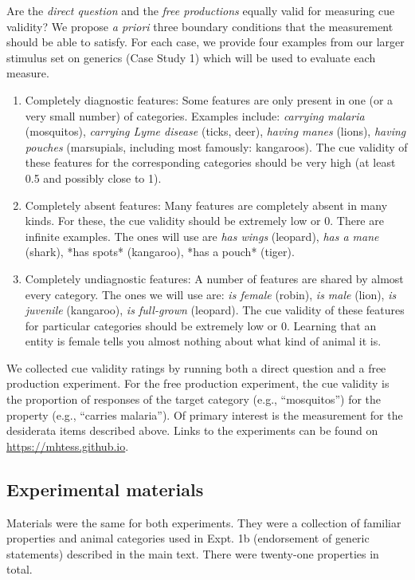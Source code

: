 \documentclass[english,floatsintext,man]{apa6}
\theoremstyle{definition}
\theoremstyle{definition}
\theoremstyle{definition}
\theoremstyle{remark}
\begin{document}
Are the \emph{direct question} and the \emph{free productions} equally
valid for measuring cue validity? We propose \emph{a priori} three
boundary conditions that the measurement should be able to satisfy. For
each case, we provide four examples from our larger stimulus set on
generics (Case Study 1) which will be used to evaluate each measure.

\begin{enumerate}
\item{Completely diagnostic features: Some features are only present in one (or a very small number) of categories. Examples include: \emph{carrying malaria} (mosquitos), \emph{carrying Lyme disease} (ticks, deer), \emph{having manes} (lions), \emph{having pouches} (marsupials, including most famously: kangaroos). The cue validity of these features for the corresponding categories should be very high (at least 0.5 and possibly close to 1).}
\item{Completely absent features: Many features are completely absent in many kinds. For these, the cue validity should be extremely low or 0. There are infinite examples. The ones will use are \emph{has wings} (leopard), \emph{has a mane} (shark), *has spots* (kangaroo), *has a pouch* (tiger). }
\item{Completely undiagnostic features: A number of features are shared by almost every category. The ones we will use are: \emph{is female} (robin), \emph{is male} (lion), \emph{is juvenile} (kangaroo), \emph{is full-grown} (leopard). The cue validity of these features for particular categories should be extremely low or 0. Learning that an entity is female tells you almost nothing about what kind of animal it is.}
\end{enumerate}

We collected cue validity ratings by running both a direct question and
a free production experiment. For the free production experiment, the
cue validity is the proportion of responses of the target category
(e.g., \enquote{mosquitos}) for the property (e.g., \enquote{carries
malaria}). Of primary interest is the measurement for the desiderata
items described above. Links to the experiments can be found on
\url{https://mhtess.github.io}.

\subsection{Experimental materials}\label{experimental-materials}

Materials were the same for both experiments. They were a collection of
familiar properties and animal categories used in Expt. 1b (endorsement
of generic statements) described in the main text. There were twenty-one
properties in total.
\end{document}
